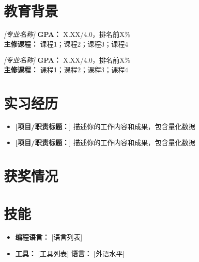 \documentclass{resume}
\begin{document}
\begin{Form}



\vspace{-8pt}

\section{教育背景}
\textit{[专业名称] \quad [学院名称]} \quad \textbf{GPA：} X.XX/4.0，排名前X\% \\
\textbf{主修课程：} 课程1；课程2；课程3；课程4

\textit{[专业名称] \quad [学院名称]} \quad \textbf{GPA：} X.XX/4.0，排名前X\% \\
\textbf{主修课程：} 课程1；课程2；课程3；课程4

\section{实习经历}
\role{[职位名称]}{[部门名称]}
\vspace{-6pt}
\begin{itemize}
    \item \textbf{[项目/职责标题：]} 描述你的工作内容和成果，包含量化数据
    \item \textbf{[项目/职责标题：]} 描述你的工作内容和成果，包含量化数据
\end{itemize}
\vspace{-2pt}

\section{获奖情况}

\section{技能}
\begin{itemize}[parsep=0.5ex]
    \item \textbf{编程语言：} [语言列表]
    \item \textbf{工具：} [工具列表] \quad \textbf{语言：} [外语水平]
\end{itemize}

\end{Form}
\end{document}
